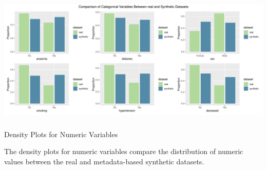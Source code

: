 \documentclass[
  letterpaper,
  DIV=11,
  numbers=noendperiod]{scrartcl}
\makeatletter
\let\oldsubparagraph\subparagraph
\renewcommand{\subparagraph}{
    \@ifstar
      \xxxSubParagraphStar
      \xxxSubParagraphNoStar
  }
\newcommand{\xxxSubParagraphStar}[1]{\oldsubparagraph*{#1}\mbox{}}
\newcommand{\xxxSubParagraphNoStar}[1]{\oldsubparagraph{#1}\mbox{}}
\makeatother
\begin{document}
\begin{center}
\includegraphics[width=1\linewidth,height=\textheight,keepaspectratio]{heart_failure_synthetic_data_project_files/figure-pdf/Bar plots for categorical variables (Metadata-based synthetic data)-1.pdf}
\end{center}

\subparagraph{Density Plots for Numeric
Variables}\label{density-plots-for-numeric-variables-3}

The density plots for numeric variables compare the distribution of
numeric values between the real and metadata-based synthetic datasets.
\end{document}
